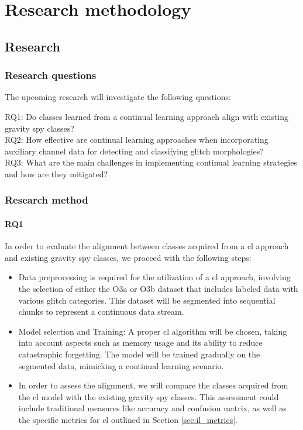 \chapter{Research methodology}
\section{Research}
\label{sec-Research}
\subsection{Research questions}
The upcoming research will investigate the following questions:  

\begin{mdframed}[backgroundcolor=lightgray!20]
\par RQ1: Do classes learned from a continual learning approach align with existing gravity spy classes?\\
RQ2: How effective are continual learning approaches when incorporating auxiliary channel data for detecting and classifying glitch morphologies?\\
RQ3: What are the main challenges in implementing continual learning strategies and how are they mitigated? 
\end{mdframed}

\subsection{Research method}
\label{subsec-researchmethod}
\subsubsection{RQ1}
In order to evaluate the alignment between classes acquired from a \acrlong{cl} approach and existing gravity spy classes, we proceed with the following steps:
\begin{itemize}
    \item Data preprocessing is required for the utilization of a \acrshort{cl} approach, involving the selection of either the O3a or O3b dataset that includes labeled data with various glitch categories. This dataset will be segmented into sequential chunks to represent a continuous data stream.
    \item Model selection and Training: A proper \acrshort{cl} algorithm will be chosen, taking into account aspects such as memory usage and its ability to reduce catastrophic forgetting. The model will be trained gradually on the segmented data, mimicking a continual learning scenario.
    \item In order to assess the alignment, we will compare the classes acquired from the \acrshort{cl} model with the existing gravity spy classes. This assessment could include traditional measures like accuracy and confusion matrix, as well as the specific metrics for \acrshort{cl} outlined in Section \ref{sec:il_metrics}. 
\end{itemize}
